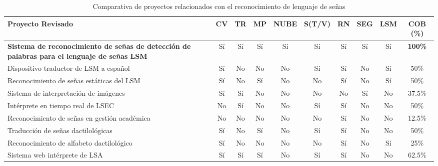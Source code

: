 \begin{table}[H]
    \centering
    \caption{Comparativa de proyectos relacionados con el reconocimiento de lenguaje de señas}
    \small
    \begin{tabular}{|p{4.5cm}|c|c|c|c|c|c|c|c|c|}
        \hline
        \textbf{Proyecto Revisado} &
        \textbf{CV} & %
        \textbf{TR} & %
        \textbf{MP} & %
        \textbf{NUBE} & %
        \textbf{S(T/V)} & %
        \textbf{RN} & %
        \textbf{SEG} & %
        \textbf{LSM} & %
        \textbf{COB (\%)} \\ \hline
        \textbf{Sistema de reconocimiento de señas de detección de palabras para el lenguaje de señas LSM} & Sí & Sí & Sí & Sí & Sí & Sí & Sí & Sí & \textbf{\cellcolor[rgb]{0.8, 1.0, 0.8} 100\%} \\ \hline
        Dispositivo traductor de LSM a español         & Sí & No & No & No & Sí & Sí & No & Sí & \cellcolor[rgb]{1.0, 0.8, 0.6} 50\% \\ \hline
        Reconocimiento de señas estáticas del LSM      & Sí & No & Sí & No & No & Sí & No & Sí & \cellcolor[rgb]{1.0, 0.8, 0.6} 50\% \\ \hline
        Sistema de interpretación de imágenes          & Sí & Sí & No & No & No & No & Sí & No & \cellcolor[rgb]{1.0, 0.7, 0.7} 37.5\% \\ \hline
        Intérprete en tiempo real de LSEC              & No & Sí & No & No & Sí & Sí & No & No & \cellcolor[rgb]{1.0, 0.8, 0.6} 50\% \\ \hline
        Reconocimiento de señas en gestión académica   & No & No & No & No & No & Sí & No & No & \cellcolor[rgb]{1.0, 0.7, 0.7} 12.5\% \\ \hline
        Traducción de señas dactilológicas             & Sí & No & Sí & No & Sí & Sí & No & No & \cellcolor[rgb]{1.0, 0.8, 0.6} 50\% \\ \hline
        Reconocimiento de alfabeto dactilológico       & Sí & No & No & No & No & Sí & No & Sí & \cellcolor[rgb]{1.0, 0.7, 0.7} 25\% \\ \hline
        Sistema web intérprete de LSA                  & Sí & Sí & Sí & No & Sí & Sí & No & No & \cellcolor[rgb]{1.0, 1.0, 0.8} 62.5\% \\ \hline

\end{tabular}
\end{table}
